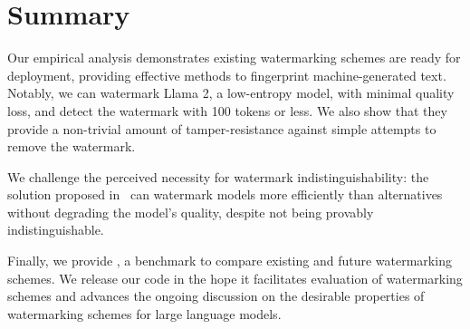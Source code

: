 \section{Summary}

Our empirical analysis demonstrates existing watermarking schemes are ready for deployment, 
providing effective methods to fingerprint machine-generated text. Notably, we can watermark Llama 2, 
a low-entropy model, with minimal quality loss, and detect the watermark with 100 tokens or less.
We also show that they provide a non-trivial amount of tamper-resistance against simple attempts to remove the watermark.

We challenge the perceived necessity for watermark indistinguishability: 
the solution proposed in~\citet{kirchenbauer_watermark_2023} can watermark models more efficiently than alternatives 
without degrading the model's quality, despite not being provably indistinguishable. 

Finally, we provide \benchmarkname{}, a benchmark to compare existing
and future watermarking schemes.
We release our code in the hope it facilitates evaluation of watermarking
schemes and advances the ongoing discussion on
the desirable properties of watermarking schemes for large language models.
